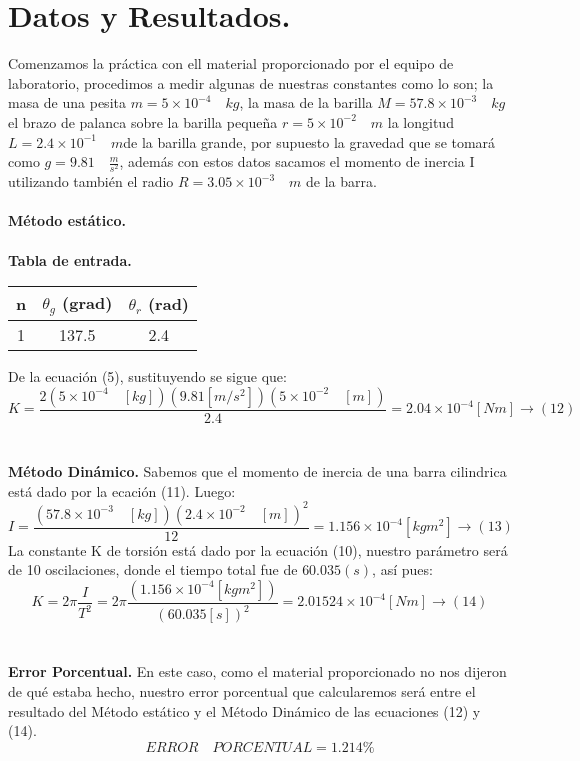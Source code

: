 \documentclass[11pt,a4paper]{article}
\begin{document}
\section{Datos y Resultados.}
Comenzamos la pr\'{a}ctica con ell material proporcionado por el equipo de laboratorio, procedimos a medir algunas de nuestras constantes como lo son; la masa de una pesita $m= 5\times { 10 }^{ -4 }\quad kg$, la masa de la barilla $M=57.8\times { 10 }^{ -3 }\quad kg$ el brazo de palanca sobre la barilla peque\~{n}a $r=5\times { 10 }^{ -2 }\quad m$ la longitud $L=2.4\times { 10 }^{ -1 }\quad m$de la barilla grande, por supuesto la gravedad que se tomar\'{a} como $g=9.81\quad \frac { m }{ { s }^{ 2 } }$, adem\'{a}s con estos datos sacamos el momento de inercia I utilizando tambi\'{e}n el radio $R=3.05\times { 10 }^{ -3 }\quad m$ de la barra.
\\
\\
\textbf{M\'{e}todo est\'{a}tico.}
\\
\\
\textbf{Tabla de entrada.}
\\
\begin{figure 6}
\centering
\begin{tabular}{|c|c|c|}
\hline 
n& $\theta_{g}$ (grad) & $\theta_{r}$ (rad)   \\ 
\hline 
1& 137.5 & 2.4  \\ 
\hline 
\end{tabular}
\end{figure 6} 
De la ecuaci\'{o}n (5), sustituyendo se sigue que:
\[ K = \frac {  2\left( 5\times { 10 }^{ -4 }\quad \left[ kg \right]  \right) \left( 9.81\left[ { m }/{ { s }^{ 2 } } \right]  \right) (5\times { 10 }^{ -2 }\quad \left[ m \right] ) }{ 2.4 } =2.04\times { 10 }^{ -4 }\left[ Nm \right] \longrightarrow (12)\]
\\
\\
\textbf{M\'{e}todo Din\'{a}mico.}
Sabemos que el momento de inercia de una barra cilindrica est\'{a} dado por la ecaci\'{o}n (11). Luego:
\[I=\frac { (57.8\times { 10 }^{ -3 }\quad \left[ kg \right] ){ (2.4\times { 10 }^{ -2 } \quad \left[ m \right] ) }^{ 2 } }{ 12 }= 1.156\times { 10 }^{ -4 }\left[ kg{ m }^{ 2 } \right]   \longrightarrow (13) \]
La constante K de torsi\'{o}n est\'{a} dado por la ecuaci\'{o}n (10), nuestro par\'{a}metro ser\'{a} de 10 oscilaciones, donde el tiempo total fue de $60.035(s)$, as\'{i} pues:
\[K=2\pi \frac { I }{ T^{ 2 } }= 2\pi \frac{(1.156\times { 10 }^{ -4 }\left[ kg{ m }^{ 2 } \right])}{(60.035\left[ s \right])^{2}}= 2.01524\times { 10 }^{ -4 }\left[ Nm \right] \longrightarrow (14) \] 
\\
\\
\textbf{Error Porcentual.}
En este caso, como el material proporcionado no nos dijeron de qu\'{e} estaba hecho, nuestro error porcentual que calcularemos ser\'{a} entre el resultado del M\'{e}todo est\'{a}tico y el M\'{e}todo Din\'{a}mico de las ecuaciones (12) y (14). 
\[ERROR \quad PORCENTUAL=1.214 \%  \] 
\\
\pagebreak
\end{document}
